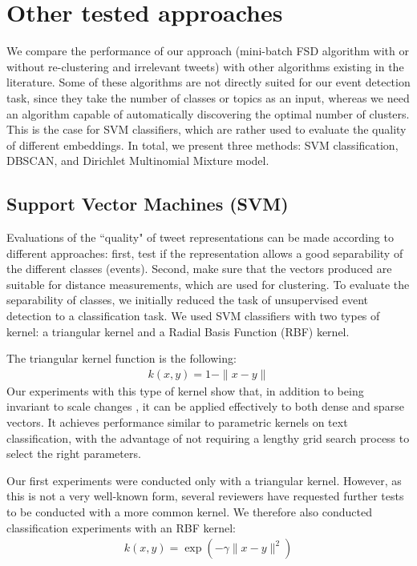 \section{Other tested approaches}
We compare the performance of our approach (mini-batch FSD algorithm with or without re-clustering and irrelevant tweets) with other algorithms existing in the literature. Some of these algorithms are not directly suited for our event detection task, since they take the number of classes or topics as an input, whereas we need an algorithm capable of automatically discovering the optimal number of clusters. This is the case for SVM classifiers, which are rather used to evaluate the quality of different embeddings. In total, we present three methods: SVM classification, DBSCAN, and Dirichlet Multinomial Mixture model.


\subsection{Support Vector Machines (SVM)}
Evaluations of the ``quality" of tweet representations can be made according to different approaches: first, test if the representation allows a good separability of the different classes (events). Second, make sure that the vectors produced are suitable for distance measurements, which are used for clustering. To evaluate the separability of classes, we initially reduced the task of unsupervised event detection to a classification task. We used SVM classifiers with two types of kernel: a triangular kernel \cite{fleuret2003scale} and a Radial Basis Function (RBF) kernel. 

The triangular kernel function is the following:
\begin{align}
\label{eq:triangular kernel}
k(x, y) = 1 - \|x - y\|
\end{align}
Our experiments with this type of kernel show that, in addition to being invariant to scale changes \citep{fleuret2003scale}, it can be applied effectively to both dense and sparse vectors. It achieves performance similar to parametric kernels on text classification, with the advantage of not requiring a lengthy grid search process to select the right parameters.

Our first experiments were conducted only with a triangular kernel. However, as this is not a very well-known form, several reviewers have requested further tests to be conducted with a more common kernel. We therefore also conducted classification experiments with an RBF kernel:
\begin{align}
\label{eq:RBF kernel}
k(x, y) = \exp(-\gamma \|x - y \|^{2})
\end{align}


